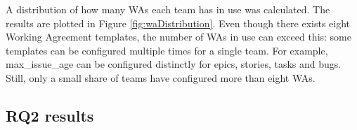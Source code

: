 

A distribution of how many WAs each team has in use was calculated. The results are plotted in Figure \ref{fig:waDistribution}. Even though there exists eight Working Agreement templates, the number of WAs in use can exceed this: some templates can be configured multiple times for a single team. For example, max\_issue\_age can be configured distinctly for epics, stories, tasks and bugs. Still, only a small share of teams have configured more than eight WAs. 



\subsection{RQ2 results}











